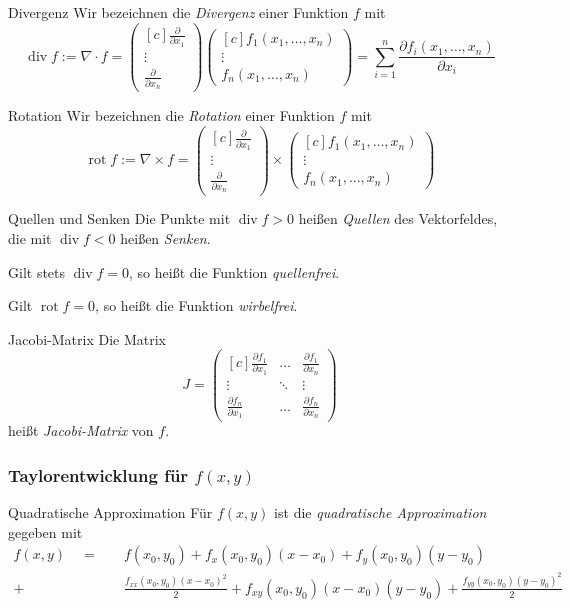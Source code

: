 \documentclass[german]{../spicker}
\newcommand{\vektor}[1]{\begin{pmatrix*}[c] #1 \end{pmatrix*}}
\begin{document}
\begin{defi}{Divergenz}
    Wir bezeichnen die \emph{Divergenz} einer Funktion $f$ mit
    $$
        \operatorname{div} f := \nabla \cdot f = \vektor{\frac{\partial}{\partial x_1} \\ \vdots \\ \frac{\partial}{\partial x_n}} \vektor{f_1(x_1, \ldots, x_n) \\ \vdots \\ f_n(x_1, \ldots, x_n)} = \sum_{i=1}^n \frac{\partial f_i(x_1, \ldots, x_n)}{\partial x_i}
    $$
\end{defi}

\begin{defi}{Rotation}
    Wir bezeichnen die \emph{Rotation} einer Funktion $f$ mit
    $$
        \operatorname{rot} f := \nabla \times f = \vektor{\frac{\partial}{\partial x_1} \\ \vdots \\ \frac{\partial}{\partial x_n}} \times \vektor{f_1(x_1, \ldots, x_n) \\ \vdots \\ f_n(x_1, \ldots, x_n)}
    $$
\end{defi}

\begin{bonus}{Quellen und Senken}
    Die Punkte mit $\operatorname{div} f > 0$ heißen \emph{Quellen} des Vektorfeldes, die mit $\operatorname{div} f < 0$ heißen \emph{Senken}.

    Gilt stets $\operatorname{div} f = 0$, so heißt die Funktion \emph{quellenfrei}.

    Gilt $\operatorname{rot} f = 0$, so heißt die Funktion \emph{wirbelfrei}.
\end{bonus}

\begin{defi}{Jacobi-Matrix}
    Die Matrix
    $$
        J = \vektor{\frac{\partial f_1}{\partial x_1} & \ldots & \frac{\partial f_1}{\partial x_n} \\ \vdots & \ddots & \vdots \\ \frac{\partial f_n}{\partial x_1} & \ldots & \frac{\partial f_n}{\partial x_n}}
    $$
    heißt \emph{Jacobi-Matrix} von $f$.
\end{defi}

\subsubsection{Taylorentwicklung für $f(x, y)$}

\begin{defi}{Quadratische Approximation}
    Für $f(x, y)$ ist die \emph{quadratische Approximation} gegeben mit
    $$
        \begin{aligned}
            f(x, y) \quad = \quad & f(x_0, y_0) + f_x(x_0, y_0) (x-x_0) + f_y(x_0, y_0) (y-y_0)                                                    \\
            + \quad               & \frac{f_{xx}(x_0, y_0) (x-x_0)^2}{2} + f_{xy}(x_0, y_0) (x-x_0) (y-y_0) + \frac{f_{yy}(x_0, y_0) (y-y_0)^2}{2}
        \end{aligned}
    $$
\end{defi}
\end{document}
